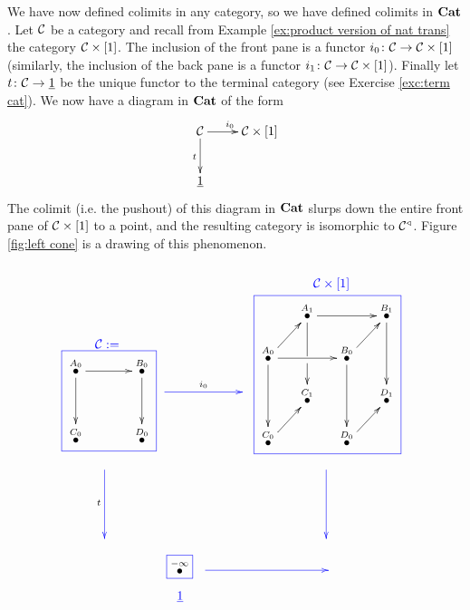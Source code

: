 \begin{example}

We have now defined colimits in any category, so we have defined colimits in ${\bf Cat}$. Let $\mathcal{C}$ be a category and recall from Example \ref{ex:product version of nat trans} the category $\mathcal{C}\times[1]$. The inclusion of the front pane is a functor $i_0\colon\mathcal{C}\rightarrow\mathcal{C}\times[1]$ (similarly, the inclusion of the back pane is a functor $i_1\colon\mathcal{C}\rightarrow\mathcal{C}\times[1]$). Finally let $t\colon\mathcal{C}\rightarrow\underline{1}$ be the unique functor to the terminal category (see Exercise \ref{exc:term cat}). We now have a diagram in ${\bf Cat}$ of the form 
$$\xymatrix{\mcC\ar[r]^{i_0}\ar[d]_{t}&\mcC\times[1]\\\ul{1}}$$
The colimit (i.e. the pushout) of this diagram in ${\bf Cat}$ slurps down the entire front pane of $\mathcal{C}\times[1]$ to a point, and the resulting category is isomorphic to $\mathcal{C}^\triangleleft$. Figure \ref{fig:left cone} is a drawing of this phenomenon.
\begin{figure}[H]
$$
\parbox{1in}{~\vspace{.6in}\boxtitle{\color{blue}{$\mcC:=$}}\cfbox{blue}{\parbox{.7in}{\xymatrix@=15pt{
\LMO{A_0}\ar[rr]\ar[dd]&&\LMO{B_0}\ar[dd]\\\\\LMO{C_0}&&\LMO{D_0}
}}}}
\parbox{1.1in}{~\vspace{.6in}\\\xymatrix{~\ar@[blue][rr]^{i_0}&\hspace{.1in}&~}}
\parbox{1.7in}{\boxtitle{\color{blue}{$\mcC\times[1]$}}\cfbox{blue}{\parbox{1.4in}{\xymatrix@=15pt{
&\LMO{A_1}\ar[rr]\ar'[d][dd]&&\LMO{B_1}\ar[dd]\\
\LMO{A_0}\ar[ur]\ar[rr]\ar[dd]&&\LMO{B_0}\ar[ur]\ar[dd]\\
&\LMO{C_1}&&\LMO{D_1}\\
\LMO{C_0}\ar[ur]&&\LMO{D_0}\ar[ur]&
}}}}
$$
$$
\hspace{-.5in}\xymatrix{~\ar@[blue][dd]_t\\\\~}\hspace{2.3in}\xymatrix{~\ar@[blue][dd]\\\\~}
$$
$$
\hspace{.4in}\parbox{.3in}{\cfbox{blue}{$\LMO{-\infty}$}\begin{center}\color{blue}{$\ul{1}$}\end{center}}
\parbox{1.6in}{\xymatrix{~\ar@[blue][rr]&\hspace{.6in}&~}\vspace{.15in}~}
$$
\end{figure}
\end{example}

